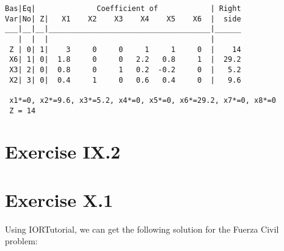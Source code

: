 \documentclass[titlepage, letterpaper]{article}
\begin{document}
\begin{lstlisting}[basicstyle=\tiny]
Bas|Eq|              Coefficient of            | Right
Var|No| Z|   X1    X2    X3    X4    X5    X6  |  side
___|__|__|_____________________________________|______
   |  |  |                                     | 
 Z | 0| 1|    3     0     0     1     1     0  |    14
 X6| 1| 0|  1.8     0     0   2.2   0.8     1  |  29.2
 X3| 2| 0|  0.8     0     1   0.2  -0.2     0  |   5.2
 X2| 3| 0|  0.4     1     0   0.6   0.4     0  |   9.6

 x1*=0, x2*=9.6, x3*=5.2, x4*=0, x5*=0, x6*=29.2, x7*=0, x8*=0
 Z = 14

\end{lstlisting}

\section{Exercise IX.2} %
\label{sec:exercise_ix_2}


\section{Exercise X.1} %
\label{sec:exercise_x_1}

Using IORTutorial, we can get the following solution for the Fuerza Civil problem:
\end{document}
